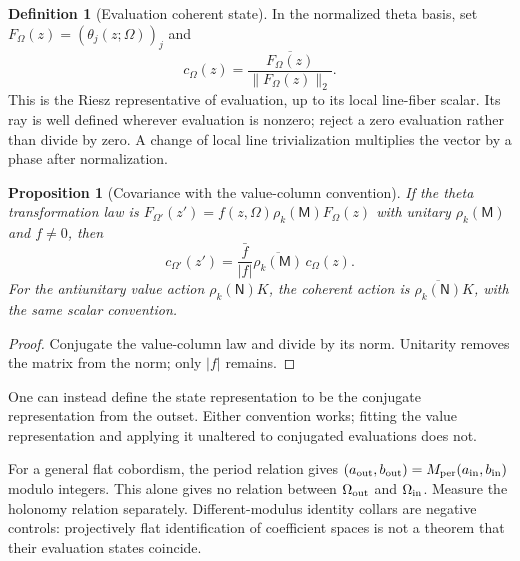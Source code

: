 \documentclass[11pt]{article}
\newtheorem{proposition}[theorem]{Proposition}
\theoremstyle{definition}
\newtheorem{definition}[theorem]{Definition}
\theoremstyle{remark}
\begin{document}
\begin{definition}[Evaluation coherent state]
In the normalized theta basis, set $F_\Omega(z)=(\theta_j(z;\Omega))_j$ and
\[
 c_\Omega(z)=\frac{\overline{F_\Omega(z)}}{\|F_\Omega(z)\|_2}.
\]
This is the Riesz representative of evaluation, up to its local line-fiber
scalar. Its ray is well defined wherever evaluation is nonzero; reject a
zero evaluation rather than divide by zero. A change of local line
trivialization multiplies the vector by a phase after normalization.
\end{definition}

\begin{proposition}[Covariance with the value-column convention]\label{prop:coherent-covariance}
If the theta transformation law is
$F_{\Omega'}(z')=f(z,\Omega)\rho_k(\mathsf M)F_\Omega(z)$ with unitary
$\rho_k(\mathsf M)$ and $f\ne0$, then
\[
 c_{\Omega'}(z')=\frac{\bar f}{|f|}
                 \overline{\rho_k(\mathsf M)}\,c_\Omega(z).
\]
For the antiunitary value action $\rho_k(\mathsf N)K$, the coherent
action is $\overline{\rho_k(\mathsf N)}K$, with the same scalar convention.
\end{proposition}
\begin{proof}
Conjugate the value-column law and divide by its norm. Unitarity removes
the matrix from the norm; only $|f|$ remains.
\end{proof}
One can instead define the state representation to be the conjugate
representation from the outset. Either convention works; fitting the
value representation and applying it unaltered to conjugated evaluations
does not.

For a general flat cobordism, the period relation gives
$(a_{\rm out},b_{\rm out})=M_{\rm per}(a_{\rm in},b_{\rm in})$ modulo
integers. This alone gives no relation between $\Omega_{\rm out}$ and
$\Omega_{\rm in}$. Measure the holonomy relation separately.
Different-modulus identity collars are negative controls:
projectively flat identification of coefficient spaces is not a theorem
that their evaluation states coincide.
\end{document}
